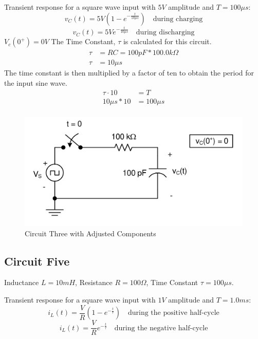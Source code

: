 \documentclass[12pt]{article}
\begin{document}
Transient response for a square wave input with $5V$ amplitude and $T = 100\mu s$:
\[
	v_C(t) = 5V(1 - e^{-\frac{t}{10\mu s}}) \quad \text{during charging}
\]
\[
	v_C(t) = 5V e^{-\frac{t}{10\mu s}} \quad \text{during discharging}
\]
$V_c(0^+) = 0V$
The Time Constant, $\tau$ is calculated for this circuit.
\begin{align*}
	\tau & = RC = 100pF * 100.0k\Omega \\
	\tau & = 10\mu s
\end{align*}
The time constant is then multiplied by a factor of ten to obtain the period for
the input sine wave.
\begin{align*}
	\tau \cdot 10 & = T        \\
	10\mu s * 10  & = 100\mu s \\
\end{align*}
\begin{figure}[H]
	\centering
	\includegraphics[width=14cm]{e5_4}
	\caption{Circuit Three with Adjusted Components}
\end{figure}
\subsection{Circuit Five}
Inductance $L = 10mH$, Resistance $R = 100\Omega$, Time Constant $\tau = 100\mu s$.

Transient response for a square wave input with $1V$ amplitude and $T = 1.0 ms$:
\[
	i_L(t) = \frac{V}{R}(1 - e^{-\frac{t}{\tau}}) \quad \text{during the positive half-cycle}
\]
\[
	i_L(t) = \frac{V}{R} e^{-\frac{t}{\tau}} \quad \text{during the negative half-cycle}
\]
\end{document}
